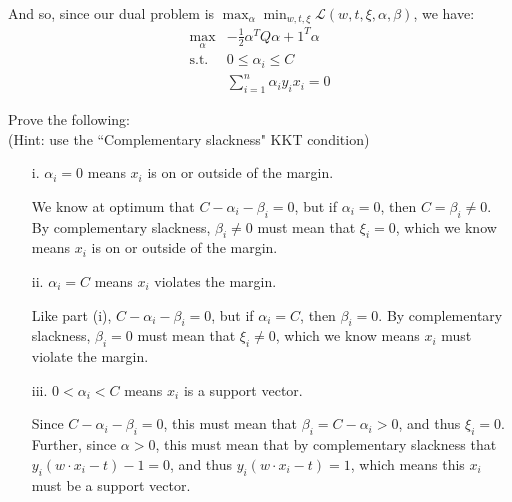 \begin{Parts}
\begin{solution}
And so, since our dual problem is $\max_{\alpha} \min_{w, t, \xi} \mathcal{L}(w, t, \xi, \alpha, \beta)$, we have:
\begin{align*}
\max_{\alpha} &-\frac{1}{2} \alpha^T Q \alpha + 1^T \alpha\\
\text{s.t. } &0 \leq \alpha_i \leq C\\
&\sum_{i=1}^n \alpha_i y_i x_i = 0
\end{align*}
\end{solution}

\Part
Prove the following:\\
(Hint: use the ``Complementary slackness" KKT condition)

\begin{enumerate}
\item[i.] $\alpha_i = 0$ means $x_i$ is on or outside of the margin.

\begin{solution}
We know at optimum that $C - \alpha_i - \beta_i = 0$, but if $\alpha_i = 0$, then $C = \beta_i \neq 0$. By complementary slackness, $\beta_i \neq 0$ must mean that $\xi_i = 0$, which we know means $x_i$ is on or outside of the margin.
\end{solution}

\item[ii.] $\alpha_i = C$ means $x_i$ violates the margin.

\begin{solution}
Like part (i), $C - \alpha_i - \beta_i = 0$, but if $\alpha_i = C$, then $\beta_i = 0$. By complementary slackness, $\beta_i = 0$ must mean that $\xi_i \neq 0$, which we know means $x_i$ must violate the margin.
\end{solution}

\item[iii.] $0 < \alpha_i < C$ means $x_i$ is a support vector.

\begin{solution}
Since $C - \alpha_i - \beta_i = 0$, this must mean that $\beta_i = C - \alpha_i  > 0$, and thus $\xi_i = 0$. Further, since $\alpha > 0$, this must mean that by complementary slackness that $y_i(w \cdot x_i - t) - 1 = 0$, and thus $y_i(w \cdot x_i - t) = 1$, which means this $x_i$ must be a support vector.
\end{solution}

\end{enumerate}

\end{Parts}

\newpage
